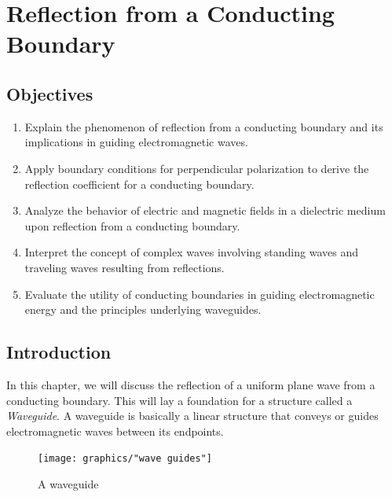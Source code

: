 \chapter{Reflection from a Conducting Boundary}\label{lec:lec34}

\begin{mdframed}[backgroundcolor=lightblue, linewidth=1pt, hidealllines=true]
    \section{Objectives}
    \begin{enumerate}[label=\roman*., itemsep=0pt, topsep=0pt]
        \item Explain the phenomenon of reflection from a conducting boundary and its implications in guiding electromagnetic waves.
        \item Apply boundary conditions for perpendicular polarization to derive the reflection coefficient for a conducting boundary.
        \item Analyze the behavior of electric and magnetic fields in a dielectric medium upon reflection from a conducting boundary.
        \item Interpret the concept of complex waves involving standing waves and traveling waves resulting from reflections.
        \item Evaluate the utility of conducting boundaries in guiding electromagnetic energy and the principles underlying waveguides.
    \end{enumerate}
\end{mdframed}

\section{Introduction}

In this chapter, we will discuss the reflection of a uniform plane wave from a conducting boundary. This will lay a foundation for a structure called a \emph{Waveguide}. A waveguide is basically a linear structure that conveys or guides electromagnetic waves between its endpoints.
\begin{figure}[h]
\centering
\texttt{[image: graphics/"wave guides"]}
\caption{A waveguide}
\end{figure}

